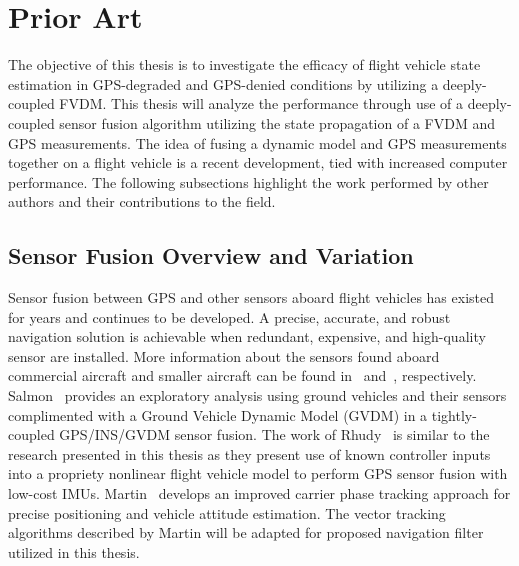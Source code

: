 \section{\textbf{Prior Art}}
The objective of this thesis is to investigate the efficacy of flight vehicle state estimation in GPS-degraded and GPS-denied conditions by utilizing a deeply-coupled FVDM\@. This thesis will analyze the performance through use of a deeply-coupled sensor fusion algorithm utilizing the state propagation of a FVDM and GPS measurements. The idea of fusing a dynamic model and GPS measurements together on a flight vehicle is a recent development, tied with increased computer performance. The following subsections highlight the work performed by other authors and their contributions to the field.
\subsection{\textbf{Sensor Fusion Overview and Variation}}
Sensor fusion between GPS and other sensors aboard flight vehicles has existed for years and continues to be developed. A precise, accurate, and robust navigation solution is achievable when redundant, expensive, and high-quality sensor are installed. More information about the sensors found aboard commercial aircraft and smaller aircraft can be found in~\cite{airbuscustomerservicesAirbusA380Aircraft2020} and~\cite{DiamondAircraftDA401969}, respectively. Salmon~\cite{salmonExperimentalExplorationLowCost2015} provides an exploratory analysis using ground vehicles and their sensors complimented with a Ground Vehicle Dynamic Model (GVDM) in a tightly-coupled GPS/INS/GVDM sensor fusion. The work of Rhudy~\cite{rhudyDynamicModelaidedSensor2017} is similar to the research presented in this thesis as they present use of known controller inputs into a propriety nonlinear flight vehicle model to perform GPS sensor fusion with low-cost IMUs. Martin~\cite{martinGPSCarrierPhase2017} develops an improved carrier phase tracking approach for precise positioning and vehicle attitude estimation. The vector tracking algorithms described by Martin will be adapted for proposed navigation filter utilized in this thesis.

